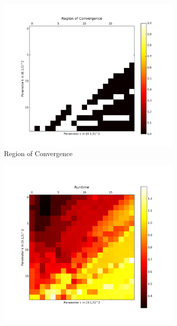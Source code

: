 \documentclass{article}
\begin{document}
\begin{figure}
    \centering
    \begin{subfigure}[b]{0.45\textwidth}
        \includegraphics[width=\textwidth]{global_conv}
        \caption{Region of Convergence}
        \label{fig:re}
    \end{subfigure}
    \begin{subfigure}[b]{0.45\textwidth}
        \includegraphics[width=\textwidth]{global_run}

\end{subfigure}
\end{figure}
\end{document}
